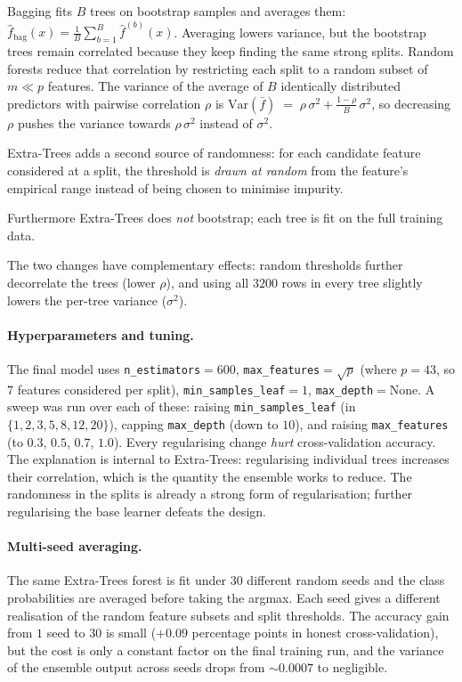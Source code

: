 \documentclass[11pt,a4paper]{article}
\begin{document}
Bagging fits $B$ trees on bootstrap samples and averages them: $\hat f_{\mathrm{bag}}(x) = \tfrac{1}{B}\sum_{b=1}^{B}\hat f^{(b)}(x)$.
Averaging lowers variance, but the bootstrap trees remain correlated because they keep
finding the same strong splits. Random forests reduce that correlation by restricting each
split to a random subset of $m\!\ll\!p$ features. The variance of the average of $B$
identically distributed predictors with pairwise correlation $\rho$ is
$\mathrm{Var}(\bar f) \;=\; \rho\,\sigma^{2} + \tfrac{1-\rho}{B}\,\sigma^{2}$,
so decreasing $\rho$ pushes the variance towards $\rho\,\sigma^2$ instead of $\sigma^2$.

Extra-Trees adds a second source of randomness: for each candidate feature considered at a
split, the threshold is \emph{drawn at random} from the feature's empirical range instead
of being chosen to minimise impurity. 

Furthermore Extra-Trees does \emph{not} bootstrap;
each tree is fit on the full training data. 

The two changes have complementary effects:
random thresholds further decorrelate the trees (lower $\rho$), and using all $3200$ rows
in every tree slightly lowers the per-tree variance ($\sigma^2$).

\paragraph{Hyperparameters and tuning.} The final model uses \texttt{n\_estimators}$=600$,
\texttt{max\_features}$=\sqrt{p}$ (where $p=43$, so $7$ features considered per split),
\texttt{min\_samples\_leaf}$=1$, \texttt{max\_depth}$=\mathrm{None}$. A sweep was run over
each of these: raising \texttt{min\_samples\_leaf} (in $\{1,2,3,5,8,12,20\}$), capping
\texttt{max\_depth} (down to $10$), and raising \texttt{max\_features} (to $0.3$, $0.5$,
$0.7$, $1.0$). Every regularising change \emph{hurt} cross-validation accuracy. The
explanation is internal to Extra-Trees: regularising individual trees increases their
correlation, which is the quantity the ensemble works to reduce. The randomness in the
splits is already a strong form of regularisation; further regularising the base learner
defeats the design.

\paragraph{Multi-seed averaging.} The same Extra-Trees forest is fit under $30$ different
random seeds and the class probabilities are averaged before taking the argmax. Each seed
gives a different realisation of the random feature subsets and split thresholds. The
accuracy gain from $1$ seed to $30$ is small ($+0.09$ percentage points in honest
cross-validation), but the cost is only a constant factor on the final training run, and
the variance of the ensemble output across seeds drops from $\sim 0.0007$ to negligible.
\end{document}
